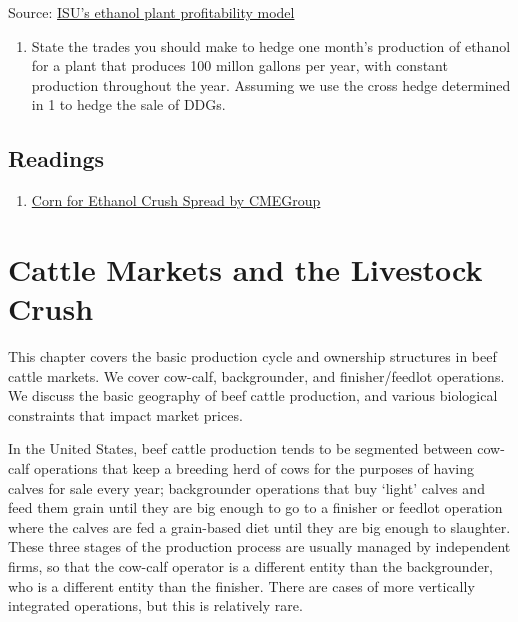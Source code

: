 \documentclass[
]{book}
\providecommand{\tightlist}{%
  \setlength{\itemsep}{0pt}\setlength{\parskip}{0pt}}
\begin{document}
Source: \href{https://www.extension.iastate.edu/agdm/articles/hof/HofJan08.html}{ISU's ethanol plant profitability model}

\begin{enumerate}
\def\labelenumi{\arabic{enumi}.}
\setcounter{enumi}{1}
\tightlist
\item
  State the trades you should make to hedge one month's production of ethanol for a plant that produces 100 millon gallons per year, with constant production throughout the year. Assuming we use the cross hedge determined in 1 to hedge the sale of DDGs.
\end{enumerate}

\hypertarget{readings-5}{%
\section{Readings}\label{readings-5}}

\begin{enumerate}
\def\labelenumi{\arabic{enumi}.}
\tightlist
\item
  \href{http://www.cmegroup.com/trading/agricultural/files/AC-406_DDG_CornCrush_042010.pdf}{Corn for Ethanol Crush Spread by CMEGroup}
\end{enumerate}

\hypertarget{cattle-markets-and-the-livestock-crush}{%
\chapter{Cattle Markets and the Livestock Crush}\label{cattle-markets-and-the-livestock-crush}}

This chapter covers the basic production cycle and ownership structures in beef cattle markets. We cover cow-calf, backgrounder, and finisher/feedlot operations. We discuss the basic geography of beef cattle production, and various biological constraints that impact market prices.

In the United States, beef cattle production tends to be segmented between cow-calf operations that keep a breeding herd of cows for the purposes of having calves for sale every year; backgrounder operations that buy `light' calves and feed them grain until they are big enough to go to a finisher or feedlot operation where the calves are fed a grain-based diet until they are big enough to slaughter. These three stages of the production process are usually managed by independent firms, so that the cow-calf operator is a different entity than the backgrounder, who is a different entity than the finisher. There are cases of more vertically integrated operations, but this is relatively rare.
\end{document}
